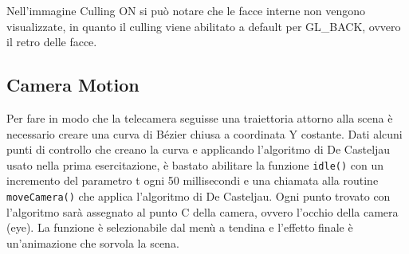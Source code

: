 Nell'immagine Culling ON si può notare che le facce interne non vengono visualizzate, in quanto il culling viene abilitato a default per GL\_BACK, ovvero il retro delle facce.

\subsection{Camera Motion}

Per fare in modo che la telecamera seguisse una traiettoria attorno alla scena è  necessario creare una curva di Bézier chiusa a coordinata Y costante. Dati alcuni punti di controllo che creano la curva e applicando l'algoritmo di De Casteljau usato nella prima esercitazione, è bastato abilitare la funzione \texttt{idle()} con un incremento del parametro t ogni 50 millisecondi e una chiamata alla routine \texttt{moveCamera()} che applica l'algoritmo di De Casteljau. Ogni punto trovato con l'algoritmo sarà assegnato al punto C della camera, ovvero l'occhio della camera (eye). La funzione è selezionabile dal menù a tendina e l'effetto finale è un'animazione che sorvola la scena. 

